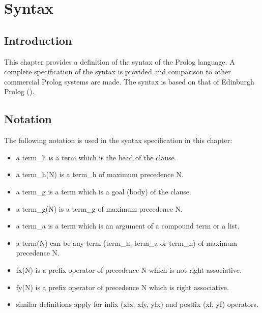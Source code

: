 %
% 
% 
% 
% 
%
%

\chapter{Syntax}
\label{chapsyntax}

\section{Introduction}

This chapter provides a definition of the syntax of the {\eclipse} Prolog language.
A complete specification of the syntax is provided and comparison  to
other commercial Prolog systems are made. The {\eclipse} syntax is based on that 
of Edinburgh Prolog (\cite{bowen81}).


\section{Notation}
The following notation is used in the syntax specification in this chapter:
\begin{itemize}
\item a term_h is a term which is the head of the clause.
\item a term_h(N) is a term_h of maximum precedence N.
\item a term_g is a term which is a goal (body) of the clause.
\item a term_g(N) is a term_g of maximum precedence N.
\item a term_a is a term which is an argument of a compound term or a list.
\item a term(N) can be any term (term_h, term_a or term_h) 
of maximum precedence N.
\item fx(N) is a prefix operator of precedence N which is not right associative.
\item fy(N) is a prefix operator of precedence N which is right associative.
\item similar definitions apply for infix (xfx, xfy, yfx) and postfix 
(xf, yf) operators.
\end{itemize}

